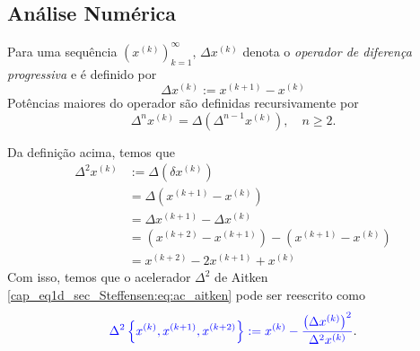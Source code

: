 \subsection{Análise Numérica}

\begin{defn}
  Para uma sequência $\left(x^{(k)}\right)_{k=1}^\infty$, $\Delta x^{(k)}$ denota o \emph{operador de diferença progressiva} e é definido por
  \begin{equation}
    \Delta x^{(k)} := x^{(k+1)} - x^{(k)}
  \end{equation}
  Potências maiores do operador são definidas recursivamente por
  \begin{equation}
    \Delta^n x^{(k)} = \Delta\left(\Delta^{n-1}x^{(k)}\right),\quad n\geq 2.
  \end{equation}
\end{defn}

Da definição acima, temos que
\begin{align}
  \Delta^2 x^{(k)} &:= \Delta\left(\delta x^{(k)}\right)\\
                   &= \Delta\left(x^{(k+1)} - x^{(k)}\right)\\
                   &= \Delta x^{(k+1)} - \Delta x^{(k)}\\
                   &= \left(x^{(k+2)} - x^{(k+1)}\right) - \left(x^{(k+1)} - x^{(k)}\right)\\
                   &= x^{(k+2)} - 2x^{(k+1)} + x^{(k)}
\end{align}
Com isso, temos que o acelerador $\Delta^2$ de Aitken \eqref{cap_eq1d_sec_Steffensen:eq:ac_aitken} pode ser reescrito como
\begin{equation}
  {\color{blue}\Delta^2\left\{x^{(k)}, x^{(k+1)}, x^{(k+2)}\right\} := x^{(k)} - \frac{\left(\Delta x^{(k)}\right)^2}{\Delta^2 x^{(k)}}}.
\end{equation}

